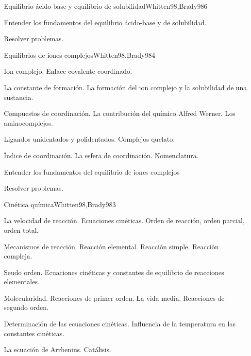 \begin{syllabus}
\begin{unit}{Equilibrio ácido-base y equilibrio de solubilidad}{Whitten98,Brady98}{6}
\begin{learningoutcomes}
	\item Entender los fundamentos del equilibrio ácido-base y de solubilidad.
	\item Resolver problemas.
\end{learningoutcomes}
\end{unit}

\begin{unit}{Equilibrios de iones complejos}{Whitten98,Brady98}{4}
\begin{topics}
	\item Ion complejo. Enlace covalente coordinado.
	\item La constante de formación. La formación del ion complejo y la solubilidad de una sustancia.
	\item Compuestos de coordinación. La contribución del químico Alfred Werner. Los aminocomplejos.
	\item Ligandos unidentados y polidentados. Complejos quelato.
	\item Índice de coordinación. La esfera de coordinación. Nomenclatura.
   \end{topics}

   \begin{learningoutcomes}
      \item Entender los fundamentos del equilibrio de iones complejos
      \item Resolver problemas.
   \end{learningoutcomes}
\end{unit}

\begin{unit}{Cinética química}{Whitten98,Brady98}{3}
\begin{topics}
      \item La velocidad de  reacción. Ecuaciones cinéticas. Orden de reacción, orden parcial, orden total.
      \item Mecanismos de reacción. Reacción elemental. Reacción simple. Reacción compleja.
	\item Seudo orden. Ecuaciones cinéticas y constantes de equilibrio de reacciones elementales.
	\item Molecularidad. Reacciones de primer orden. La vida media. Reacciones de segundo orden.
	\item Determinación de las ecuaciones cinéticas. Influencia de la temperatura en las constantes cinéticas.
	\item La ecuación de Arrhenius. Catálisis.
  \end{topics}


\end{unit}
\end{syllabus}

